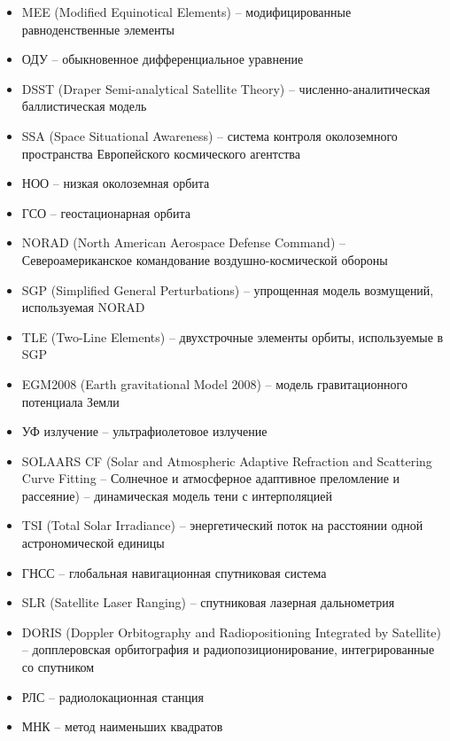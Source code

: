 \begin{itemize}
    \item MEE (Modified Equinotical Elements) -- модифицированные равноденственные элементы
    \item ОДУ -- обыкновенное дифференциальное уравнение
    \item DSST (Draper Semi-analytical Satellite Theory) -- численно-аналитическая баллистическая модель
    \item SSA (Space Situational Awareness) -- система контроля околоземного пространства Европейского космического агентства
    \item НОО -- низкая околоземная орбита
    \item ГСО -- геостационарная орбита
    \item NORAD (North American Aerospace Defense Command) -- Североамериканское командование воздушно-космической обороны
    \item SGP (Simplified General Perturbations) -- упрощенная модель возмущений, используемая NORAD
    \item TLE (Two-Line Elements) -- двухстрочные элементы орбиты, используемые в SGP
    \item EGM2008 (Earth gravitational Model 2008) -- модель гравитационного потенциала Земли
    \item УФ излучение -- ультрафиолетовое излучение
    \item SOLAARS CF (Solar and Atmospheric Adaptive Refraction and Scattering Curve Fitting
    -- Солнечное и атмосферное адаптивное преломление и рассеяние) -- динамическая модель тени с интерполяцией
    \item TSI (Total Solar Irradiance) -- энергетический поток на расстоянии одной астрономической единицы
    \item ГНСС -- глобальная навигационная спутниковая система
    \item SLR (Satellite Laser Ranging) -- спутниковая лазерная дальнометрия
    \item DORIS (Doppler Orbitography and Radiopositioning Integrated by Satellite) -- допплеровская орбитография и радиопозиционирование, интегрированные со спутником
    \item РЛС -- радиолокационная станция
    \item МНК -- метод наименьших квадратов
\end{itemize}

\newpage